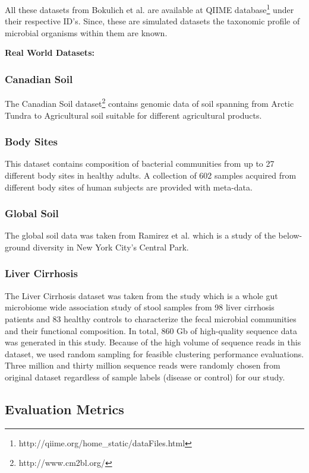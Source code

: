 \documentclass[10pt, conference, compsocconf]{IEEEtran}
\begin{document}
All these datasets from Bokulich et al. \cite{MARmockDatasetRef} are available at QIIME database\footnote{http://qiime.org/home\_static/dataFiles.html} under their respective ID's. Since, these are simulated datasets the taxonomic profile of microbial organisms within them are known.

\textbf{Real World Datasets:}

\subsubsection{Canadian Soil}
The Canadian Soil dataset\footnote{http://www.cm2bl.org/} contains genomic data of soil spanning from Arctic Tundra to Agricultural soil suitable for different agricultural products.  

\subsubsection{Body Sites}
This dataset contains composition of bacterial communities from up to 27 different body sites in healthy adults. A collection of 602 samples acquired from different body sites of human subjects are provided with meta-data.

\subsubsection{Global Soil}
The global soil data was taken from Ramirez et al. \cite{MARglobalSoil} which is a study of the below-ground diversity in New York City's Central Park.

\subsubsection{Liver Cirrhosis}
The Liver Cirrhosis dataset was taken from the study \cite{qin2014alterations} which is a whole gut microbiome wide association study of stool samples from 98 liver cirrhosis patients and 83 healthy controls to characterize the fecal microbial communities and their functional composition. In total, 860 Gb of high-quality sequence data was generated in this study. Because of the high volume of sequence reads in this dataset, we used random sampling for feasible clustering performance evaluations. Three million and thirty million sequence reads were randomly chosen from original dataset regardless of sample labels (disease or control) for our study.   


\subsection{\textbf{Evaluation Metrics}}
\end{document}
